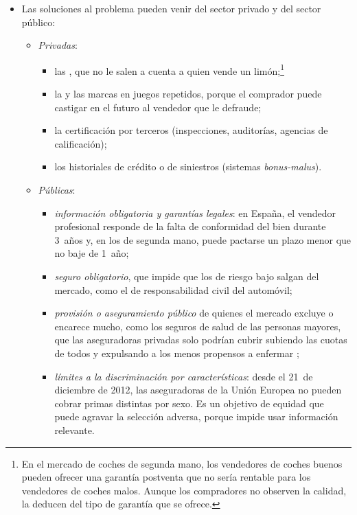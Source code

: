 \documentclass[11pt]{article}
\begin{document}
\begin{itemize}
\item Las soluciones al problema pueden venir del sector privado y del sector público:
  \begin{itemize}
  \item \emph{Privadas}:
    \begin{itemize}
    \item las , que no le salen a cuenta a quien vende un limón;\footnote{En el mercado de coches de segunda mano, los vendedores de coches buenos pueden ofrecer una garantía postventa que no sería rentable para los vendedores de coches malos. Aunque los compradores no observen la calidad, la deducen del tipo de garantía que se ofrece.}
    \item la  y las marcas en juegos repetidos, porque el comprador puede castigar en el futuro al vendedor que le defraude;
    \item la certificación por terceros (inspecciones, auditorías, agencias de calificación);
    \item los historiales de crédito o de siniestros (sistemas \emph{bonus-malus}).
    \end{itemize}
  \item \emph{Públicas}:
    \begin{itemize}
    \item \emph{información obligatoria y garantías legales}: en España, el vendedor profesional responde de la falta de conformidad del bien durante 3~años y, en los de segunda mano, puede pactarse un plazo menor que no baje de 1~año\nocite{RDL7-2021};
    \item \emph{seguro obligatorio}, que impide que los de riesgo bajo salgan del mercado, como el de responsabilidad civil del automóvil\nocite{RDLeg8-2004};
    \item \emph{provisión o aseguramiento público} de quienes el mercado excluye o encarece mucho, como los seguros de salud de las personas mayores, que las aseguradoras privadas solo podrían cubrir subiendo las cuotas de todos y expulsando a los menos propensos a enfermar ;
    \item \emph{límites a la discriminación por características}: desde el 21~de diciembre de 2012, las aseguradoras de la Unión Europea no pueden cobrar primas distintas por sexo\nocite{TJUE2011TestAchats}. Es un objetivo de equidad que puede agravar la selección adversa, porque impide usar información relevante.
    \end{itemize}

\end{itemize}
\end{itemize}
\end{document}

